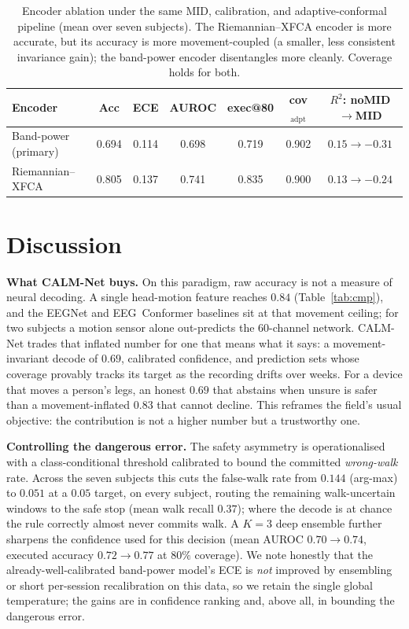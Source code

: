 \documentclass[journal]{IEEEtran}
\begin{document}
\begin{table}[t]
\caption{Encoder ablation under the same MID, calibration, and adaptive-conformal
pipeline (mean over seven subjects). The Riemannian--XFCA encoder is more accurate,
but its accuracy is more movement-coupled (a smaller, less consistent invariance
gain); the band-power encoder disentangles more cleanly. Coverage holds for both.}
\label{tab:enc}
\centering
\begin{tabular}{lcccccc}
\toprule
Encoder & Acc & ECE & AUROC & exec@80 & cov$_{\text{adpt}}$ & $R^2$: noMID$\rightarrow$MID \\
\midrule
Band-power (primary) & 0.694 & 0.114 & 0.698 & 0.719 & 0.902 & $0.15\rightarrow-0.31$ \\
Riemannian--XFCA & 0.805 & 0.137 & 0.741 & 0.835 & 0.900 & $0.13\rightarrow-0.24$ \\
\bottomrule
\end{tabular}
\end{table}

\section{Discussion}
\textbf{What CALM-Net buys.} On this paradigm, raw accuracy is not a measure of neural
decoding. A single head-motion feature reaches $0.84$ (Table~\ref{tab:cmp}), and the
EEGNet and EEG~Conformer baselines sit at that movement ceiling; for two subjects a
motion sensor alone out-predicts the $60$-channel network. CALM-Net trades that
inflated number for one that means what it says: a movement-invariant decode of
$0.69$, calibrated confidence, and prediction sets whose coverage provably tracks its
target as the recording drifts over weeks. For a device that moves a person's legs, an
honest $0.69$ that abstains when unsure is safer than a movement-inflated $0.83$ that
cannot decline. This reframes the field's usual objective: the contribution is not a
higher number but a trustworthy one.

\textbf{Controlling the dangerous error.} The safety asymmetry is operationalised
with a class-conditional threshold calibrated to bound the committed \emph{wrong-walk}
rate. Across the seven subjects this cuts the false-walk rate from $0.144$ (arg-max)
to $0.051$ at a $0.05$ target, on every subject, routing the remaining walk-uncertain
windows to the safe stop (mean walk recall $0.37$); where the decode is at chance the
rule correctly almost never commits walk. A $K{=}3$ deep ensemble further sharpens the
confidence used for this decision (mean AUROC $0.70\rightarrow0.74$, executed accuracy
$0.72\rightarrow0.77$ at $80\%$ coverage). We note honestly that the
already-well-calibrated band-power model's ECE is \emph{not} improved by ensembling or
short per-session recalibration on this data, so we retain the single global
temperature; the gains are in confidence ranking and, above all, in bounding the
dangerous error.
\end{document}
